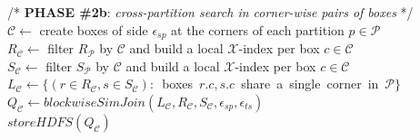 \begin{algorithm}[!ht]
\begin{small}
\nonl /* {\bf PHASE \#2b}: {\em cross-partition search in corner-wise pairs of boxes} */ \\
  
  $\mathcal{C} \leftarrow$ create boxes of side $\epsilon_{sp}$ at the corners of each partition $p \in \mathcal{P}$ \\
  $R_{\mathcal{C}} \leftarrow $ filter $R_{\mathcal{P}}$ by $\mathcal{C}$ and build a local $\mathcal{X}$-index per box $c \in \mathcal{C}$\\
  $S_{\mathcal{C}} \leftarrow $ filter $S_{\mathcal{P}}$ by $\mathcal{C}$ and build a local $\mathcal{X}$-index per box $c \in \mathcal{C}$\\
  \mbox{$L_{\mathcal{C}} \leftarrow \{ ( r \in R_{\mathcal{C}}, s \in S_{\mathcal{C}}):$ boxes $r.c, s.c$ share a single corner in  $\mathcal{P}\}$} \\
  $Q_{\mathcal{C}} \leftarrow blockwiseSimJoin(L_{\mathcal{C}}, R_{\mathcal{C}}, S_{\mathcal{C}},\epsilon_{sp}, \epsilon_{ts})$ \\  
  $storeHDFS(Q_{\mathcal{C}})$   \\

  \vspace{6pt}

  \caption{$SimJoinMR(\mathcal{T}_{R},\mathcal{T}_{S}, \epsilon_{sp}, \epsilon_{ts}, \mathcal{X} )$}
  \label{alg:simjoin_mr}
\end{small}
\end{algorithm}

